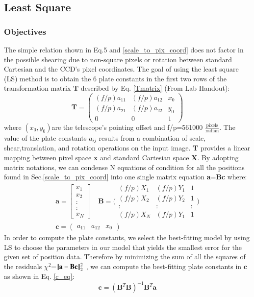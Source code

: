 \documentclass[authoryear, 12pt,5p, times]{elsarticle}
\begin{document}
	\subsection{Least Square}\label{ls}
	\subsubsection{Objectives}\label{theory}
	The simple relation shown in Eq.5 and \ref{scale_to_pix_coord} does not factor in the possible shearing due to non-square pixels or rotation between standard Cartesian and the CCD's pixel coordinates. The goal of using the least square (LS) method  is to obtain the 6 plate constants in the first two rows of the transformation matrix \textbf{T} described by Eq. \ref{Tmatrix} (From Lab Handout): 
	\begin{equation}
\textbf{T}=	\begin{pmatrix}
(f/p)a_{11} & (f/p)a_{12} & x_0\\ 
(f/p)a_{21} & (f/p)a_{22} & y_0\\ 
0 &0  & 1
\end{pmatrix}
	\label{Tmatrix}
	\end{equation}
where $(x_0 , y_0)$are the telescope's pointing offset and f/p=561000 $\frac{\textrm{pixels}}{\textrm{radian}}$. 
The value of the plate constants $a_{ij}$ results from a combination of scale, shear,translation, and rotation operations on the input image. \textbf{T} provides a linear mapping between pixel space  \textbf{x} and standard Cartesian space \textbf{X}. By adopting matrix notations, we can condense N equations of condition for all the positions found in Sec.\ref{scale_to_pix_coord} into one single matrix equation \textbf{a}=\textbf{Bc} where: 
\begin{align}
\label{aBc}
\textbf{a}= \begin{bmatrix}
 x_1
\\ x_2
\\:
\\:
\\x_N
\end{bmatrix}
\quad
\textbf{B}=\Bigg(\begin{smallmatrix}
(f/p)X_1 & (f/p)Y_1  & 1\\ 
(f/p)X_2  & (f/p)Y_2  & 1\\ 
: &:  &: \\ 
(f/p)X_N  &(f/p)Y_1   & 1
\end{smallmatrix}\Bigg)
\\
\textbf{c} = \begin{pmatrix}
a_{11} & a_{12} & x_0 
\end{pmatrix}
\end{align}
		In order to compute the plate constants, we select the best-fitting model by using LS to choose the parameters in our model that yields the smallest error for the given set of position data. Therefore by minimizing the sum of all the squares of the residuals $\chi^2$=$\|\textbf{a}-\textbf{Bc}\|^2_{\tiny{2}}$ , we can compute the best-fitting plate constants in $\textbf{c}$ as shown in Eq. \ref{c_eq}:
		\begin{equation}
		\textbf{c} = (\textbf{B}^T\textbf{B})^{-1}\textbf{B}^T\textbf{a}
		\label{c_eq}
		\end{equation}
			
\end{document}
